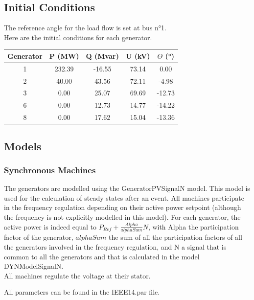 \documentclass[a4paper, 12pt]{report}
\begin{document}
\subsection{Initial Conditions}

The reference angle for the load flow is set at bus n°1. \\

Here are the initial conditions for each generator.

\begin{center}
\begin{tabular}{|c|c|c|c|c|}
  \hline
  Generator & P (MW) & Q (Mvar) & U (kV) & $\Theta$ (°) \\
  \hline
  1 & 232.39 & -16.55 & 73.14 & 0.00\\
  2 & 40.00 & 43.56 & 72.11 & -4.98\\
  3 & 0.00 & 25.07 & 69.69 & -12.73\\
  6 & 0.00 & 12.73 & 14.77 & -14.22\\
  8 & 0.00 & 17.62 & 15.04 & -13.36\\
  \hline
\end{tabular}
\end{center}

\subsection{Models}

\subsubsection{Synchronous Machines}

The generators are modelled using the GeneratorPVSignalN model. This model is used for the calculation of steady states after an event. All machines participate in the frequency regulation depending on their active power setpoint (although the frequency is not explicitly modelled in this model). For each generator, the active power is indeed equal to $P_{Ref} + \frac{Alpha}{alphaSum}N$, with Alpha the participation factor of the generator, $alphaSum$ the sum of all the participation factors of all the generators involved in the frequency regulation, and N a signal that is common to all the generators and that is calculated in the model DYNModelSignalN. \\
All machines regulate the voltage at their stator.

All parameters can be found in the IEEE14.par file.
\end{document}
